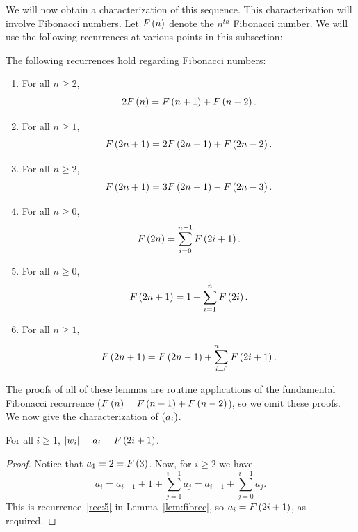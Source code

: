 \documentclass[english,12pt]{article}
\newcommand{\seq}{\p}
\begin{document}
We will now obtain a characterization of this sequence.  This characterization will involve Fibonacci numbers.  Let $F\left(n\right)$ denote the $n^{th}$ Fibonacci number.  We will use the following recurrences at various points in this subsection:
\begin{lemma}\label{lem:fibrec}
The following recurrences hold regarding Fibonacci numbers:
\begin{enumerate}
\item\label{rec:0} For all $n\geq2$,
\[
2F\left(n\right)=F\left(n+1\right)+F\left(n-2\right).
\]
\item\label{rec:1} For all $n\geq1$,
\[
F\left(2n+1\right)=2F\left(2n-1\right)+F\left(2n-2\right).
\]
\item\label{rec:2} For all $n\geq2$,
\[
F\left(2n+1\right)=3F\left(2n-1\right)-F\left(2n-3\right).
\]
\item\label{rec:3} For all $n\geq0$,
\[
F\left(2n\right)=\sum_{i=0}^{n-1}F\left(2i+1\right).
\]
\item\label{rec:4} For all $n\geq0$,
\[
F\left(2n+1\right)=1+\sum_{i=1}^{n}F\left(2i\right).
\]
\item\label{rec:5} For all $n\geq1$,
\[
F\left(2n+1\right)=F\left(2n-1\right)+\sum_{i=0}^{n-1}F\left(2i+1\right).
\]
\end{enumerate}
\end{lemma}
The proofs of all of these lemmas are routine applications of the fundamental Fibonacci recurrence ($F\left(n\right)=F\left(n-1\right)+F\left(n-2\right)$), so we omit these proofs.  We now give the characterization of $\seq{a_i}$.
\begin{prop}\label{prop:wlen}
For all $i\geq1$, $\left|w_i\right|=a_i=F\left(2i+1\right)$.
\end{prop}
\begin{proof}
Notice that $a_1=2=F\left(3\right)$.  Now, for $i\geq2$ we have
\[
a_i=a_{i-1}+1+\sum_{j=1}^{i-1}a_j
=a_{i-1}+\sum_{j=0}^{i-1}a_j.
\]
This is recurrence~\ref{rec:5} in Lemma~\ref{lem:fibrec}, so $a_i=F\left(2i+1\right)$, as required.
\end{proof}
\end{document}
